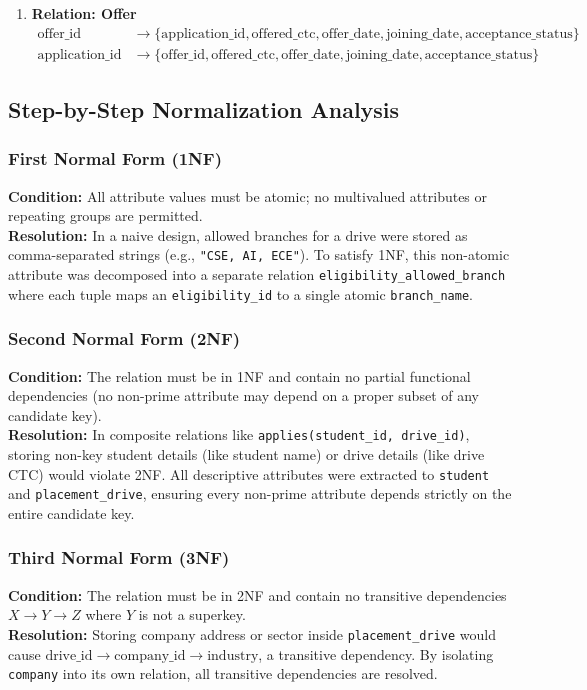 \documentclass[11pt,a4paper]{article}
\begin{document}
\begin{enumerate}[label=\textbf{\arabic*.}]
    \item \textbf{Relation: Offer}
    \[
    \begin{aligned}
        \text{offer\_id} &\to \{\text{application\_id}, \text{offered\_ctc}, \text{offer\_date}, \text{joining\_date}, \text{acceptance\_status}\} \\
        \text{application\_id} &\to \{\text{offer\_id}, \text{offered\_ctc}, \text{offer\_date}, \text{joining\_date}, \text{acceptance\_status}\}
    \end{aligned}
    \]
\end{enumerate}

\subsection{Step-by-Step Normalization Analysis}

\subsubsection{First Normal Form (1NF)}
\textbf{Condition:} All attribute values must be atomic; no multivalued attributes or repeating groups are permitted.\\
\textbf{Resolution:} In a naive design, allowed branches for a drive were stored as comma-separated strings (e.g., \texttt{"CSE, AI, ECE"}). To satisfy 1NF, this non-atomic attribute was decomposed into a separate relation \texttt{eligibility\_allowed\_branch} where each tuple maps an \texttt{eligibility\_id} to a single atomic \texttt{branch\_name}.

\subsubsection{Second Normal Form (2NF)}
\textbf{Condition:} The relation must be in 1NF and contain no partial functional dependencies (no non-prime attribute may depend on a proper subset of any candidate key).\\
\textbf{Resolution:} In composite relations like \texttt{applies(student\_id, drive\_id)}, storing non-key student details (like student name) or drive details (like drive CTC) would violate 2NF. All descriptive attributes were extracted to \texttt{student} and \texttt{placement\_drive}, ensuring every non-prime attribute depends strictly on the entire candidate key.

\subsubsection{Third Normal Form (3NF)}
\textbf{Condition:} The relation must be in 2NF and contain no transitive dependencies $X \to Y \to Z$ where $Y$ is not a superkey.\\
\textbf{Resolution:} Storing company address or sector inside \texttt{placement\_drive} would cause $\text{drive\_id} \to \text{company\_id} \to \text{industry}$, a transitive dependency. By isolating \texttt{company} into its own relation, all transitive dependencies are resolved.
\end{document}
